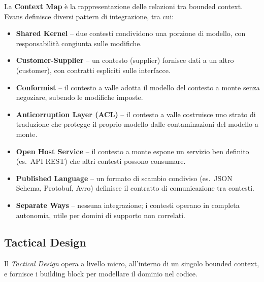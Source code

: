 \documentclass[12pt,a4paper]{report}
\begin{document}
\begin{description}[style=nextline, leftmargin=1.5cm]
  \item[\textsf{Context Map}]
    La \textbf{Context Map} è la rappresentazione delle relazioni tra bounded
    context. Evans definisce diversi pattern di integrazione, tra cui:
    \begin{itemize}
      \item \textbf{Shared Kernel} -- due contesti condividono una porzione di
            modello, con responsabilità congiunta sulle modifiche.
      \item \textbf{Customer-Supplier} -- un contesto (supplier) fornisce dati
            a un altro (customer), con contratti espliciti sulle interfacce.
      \item \textbf{Conformist} -- il contesto a valle adotta il modello del
            contesto a monte senza negoziare, subendo le modifiche imposte.
      \item \textbf{Anticorruption Layer (ACL)} -- il contesto a valle costruisce
            uno strato di traduzione che protegge il proprio modello dalle
            contaminazioni del modello a monte.
      \item \textbf{Open Host Service} -- il contesto a monte espone un servizio
            ben definito (es.\ API REST) che altri contesti possono consumare.
      \item \textbf{Published Language} -- un formato di scambio condiviso
            (es.\ JSON Schema, Protobuf, Avro) definisce il contratto di
            comunicazione tra contesti.
      \item \textbf{Separate Ways} -- nessuna integrazione; i contesti operano
            in completa autonomia, utile per domini di supporto non correlati.
    \end{itemize}
\end{description}

\subsection{Tactical Design}

Il \textit{Tactical Design} opera a livello micro, all'interno di un singolo
bounded context, e fornisce i building block per modellare il dominio nel codice.
\end{document}
